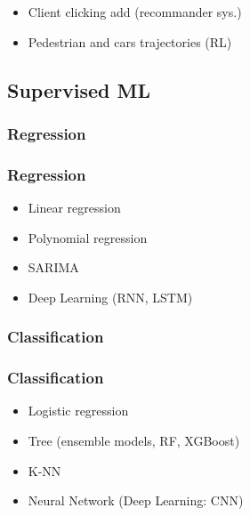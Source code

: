 \begin{frame}
\begin{itemize}
\begin{itemize}
\begin{minipage}{0.60\linewidth}
\begin{figure}[H]
            \end{figure}
         \end{minipage}
         \item Client clicking add (recommander sys.)
         \item Pedestrian and cars trajectories (RL)
      \end{itemize}
   \end{itemize}
\end{frame}


\subsection{Supervised ML}

\subsubsection{Regression}

\begin{frame}\frametitle{Regression}
   \begin{itemize}
      \item Linear regression
      \item Polynomial regression
      \item SARIMA
      \item Deep Learning (RNN, LSTM)
   \end{itemize}
\end{frame}


\subsubsection{Classification}

\begin{frame}\frametitle{Classification}
   \begin{itemize}
      \item Logistic regression
      \item Tree (ensemble models, RF, XGBoost)
      \item K-NN
      \item Neural Network (Deep Learning: CNN)
   \end{itemize}
\end{frame}



